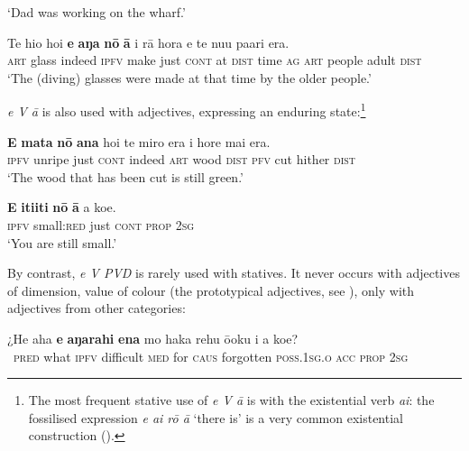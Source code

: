 \glt 
‘Dad was working on the wharf.’ \textstyleExampleref{[R210.041]} 
\z

\ea\label{ex:7.36}
\gll Te hi{\ꞌ}o ho{\ꞌ}i \textbf{e} \textbf{aŋa} \textbf{nō} \textbf{{\ꞌ}ā} {\ꞌ}i rā hora e te nu{\ꞌ}u pa{\ꞌ}ari era.\\
\textsc{art} glass indeed \textsc{ipfv} make just \textsc{cont} at \textsc{dist} time \textsc{ag} \textsc{art} people adult \textsc{dist}\\

\glt
‘The (diving) glasses were made at that time by the older people.’ \textstyleExampleref{[R360.027]} 
\z

\textit{e V {\ꞌ}ā} is also used with adjectives, expressing an enduring state:\footnote{\label{fn:327}The most frequent stative use of \textit{e V {\ꞌ}ā} is with the existential verb \textit{ai}: the fossilised expression \textit{e ai rō {\ꞌ}ā} ‘there is’ is a very common existential construction ().}

\ea\label{ex:7.37}
\gll \textbf{E} \textbf{mata} \textbf{nō} \textbf{{\ꞌ}ana} ho{\ꞌ}i te miro era i hore mai era. \\
\textsc{ipfv} unripe just \textsc{cont} indeed \textsc{art} wood \textsc{dist} \textsc{pfv} cut hither \textsc{dist} \\

\glt 
‘The wood that has been cut is still green.’ \textstyleExampleref{[R200.063]} 
\z

\ea\label{ex:7.38}
\gll \textbf{E} \textbf{{\ꞌ}iti{\ꞌ}iti} \textbf{nō} \textbf{{\ꞌ}ā} a koe. \\
\textsc{ipfv} small:\textsc{red} just \textsc{cont} \textsc{prop} \textsc{2sg} \\

\glt
‘You are still small.’ \textstyleExampleref{[R210.052]} 
\z

By contrast, \textit{e V PVD} is rarely used with statives. It never occurs with adjectives of dimension, value of colour (the prototypical adjectives, see ), only with adjectives from other categories:

\ea\label{ex:7.39}
\gll ¿He aha \textbf{e} \textbf{aŋarahi} \textbf{ena} mo haka rehu ō{\ꞌ}oku i a koe? \\
~\textsc{pred} what \textsc{ipfv} difficult \textsc{med} for \textsc{caus} forgotten \textsc{poss.1sg.o} \textsc{acc} \textsc{prop} \textsc{2sg} \\

